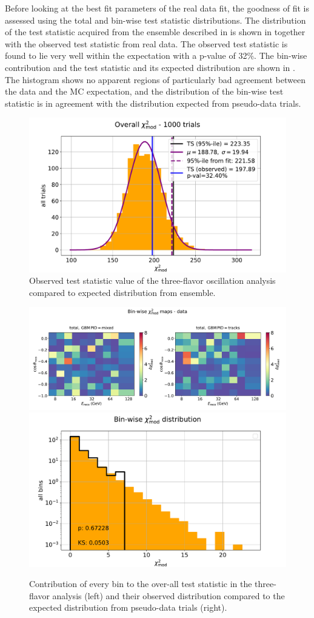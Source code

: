 Before looking at the best fit parameters of the real data fit, the goodness of fit is assessed using the total and bin-wise test statistic distributions. The distribution of the test statistic acquired from the ensemble described in  is shown in  together with the observed test statistic from real data. The observed test statistic is found to lie very well within the expectation with a p-value of 32\%. The bin-wise contribution and the test statistic and its expected distribution are shown in . The histogram shows no apparent regions of particularly bad agreement between the data and the MC expectation, and the distribution of the bin-wise test statistic is in agreement with the distribution expected from pseudo-data trials.

\begin{figure}
    \centering
    \includegraphics[width=0.8\linewidth]{figures/measurement/three_flavor/ensemble_pre_fit/overall_ts_wings_trials.pdf}
    \caption{Observed test statistic value of the three-flavor oscillation analysis compared to expected distribution from ensemble.}
    \label{fig:three-flavor-ts-ensemble}
\end{figure}

\begin{figure}
    \centering
    \includegraphics[height=0.22\linewidth,trim={0 0 0 1.5cm},clip]{figures/measurement/three_flavor/ensemble_pre_fit/real_fit_binwise_pulls_pre_bugfix.pdf}
    \includegraphics[height=0.22\linewidth]{figures/measurement/three_flavor/ensemble_pre_fit/binwise_ts_wings_trials.pdf}
    \caption{Contribution of every bin to the over-all test statistic in the three-flavor analysis (left) and their observed distribution compared to the expected distribution from pseudo-data trials (right).}
    \label{fig:three-flavor-binwise-ts}
\end{figure}

